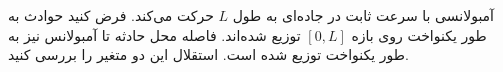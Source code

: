 \problem{}
آمبولانسی با سرعت ثابت در جاده‌ای به طول $L$ حرکت می‌کند. فرض کنید حوادث به طور یکنواخت روی بازه $[0, L]$ توزیع شده‌اند. فاصله محل حادثه تا آمبولانس نیز به طور یکنواخت توزیع شده است. استقلال این دو متغیر را بررسی کنید.
